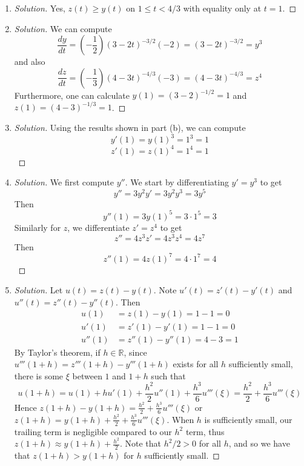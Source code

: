 \documentclass{article}
\newcommand{\R}{{\mathbb R}}
\begin{document}
\begin{enumerate}
	\item \begin{proof}[Solution]\let\qed\relax
		Yes, $z(t) \geq y(t)$ on $1 \leq t < 4/3$ with equality
		only at $t = 1$.
	\end{proof}
	\item \begin{proof}[Solution]\let\qed\relax
		We can compute
		\[
			\frac{dy}{dt} = \left(-\frac{1}{2}\right)(3-2t)^{-3/2}(-2)
			= (3-2t)^{-3/2} = y^3
		\]
		and also
		\[
			\frac{dz}{dt} = \left(-\frac{1}{3}\right)(4-3t)^{-4/3}(-3)
			= (4-3t)^{-4/3} = z^4
		\]
		Furthermore, one can calculate $y(1) = (3-2)^{-1/2} = 1$
		and $z(1) = (4-3)^{-1/3} = 1$.
	\end{proof}
	\item \begin{proof}[Solution]\let\qed\relax
		Using the results shown in part (b), we can compute
		\[
			y'(1) = y(1)^3 = 1^3 = 1
		\]
		\[
			z'(1) = z(1)^4 = 1^4 = 1
		\]
	\end{proof}
	\item \begin{proof}[Solution]\let\qed\relax
		We first compute $y''$. We start by differentiating $y' = y^3$ to get
		\[
			y'' = 3y^2y' = 3y^2y^3 = 3y^5
		\]
		Then
		\[
			y''(1) = 3y(1)^5 = 3\cdot 1^5 = 3
		\]
		Similarly for $z$, we differentiate $z' = z^4$ to get
		\[
			z'' = 4z^3z' = 4z^3z^4 = 4z^7
		\]
		Then
		\[
			z''(1) = 4z(1)^7 = 4\cdot 1^7 = 4
		\]
	\end{proof}
	\item \begin{proof}[Solution]\let\qed\relax
		Let $u(t) = z(t) - y(t)$.
		Note $u'(t) = z'(t) - y'(t)$ and $u''(t) = z''(t) - y''(t)$.
		Then
		\begin{align*}
			u(1) &= z(1) - y(1) = 1-1 = 0\\
			u'(1) &= z'(1) - y'(1) = 1-1 = 0\\
			u''(1) &= z''(1) - y''(1) = 4 - 3 = 1
		\end{align*}
		By Taylor's theorem, if $h \in \R$,
		since $u'''(1+h) = z'''(1+h) - y'''(1+h)$ exists for all
		$h$ sufficiently small,
		there is some $\xi$ between $1$ and $1+h$ such that
		\[
			u(1 + h) = u(1) + hu'(1) + \frac{h^2}{2}u''(1) + \frac{h^3}{6}u'''(\xi)
			= \frac{h^2}{2} + \frac{h^3}{6}u'''(\xi)
		\]
		Hence $z(1+h) - y(1+h) = \frac{h^2}{2}+\frac{h^3}{6}u'''(\xi)$
		or $z(1+h) = y(1+h) + \frac{h^2}{2} + \frac{h^3}{6}u'''(\xi)$.
		When $h$ is sufficiently small, our trailing term is negligible
		compared to our $h^2$ term,
		thus $z(1+h) \approx y(1+h) + \frac{h^2}{2}$.
		Note that $h^2/2 > 0$ for all $h$, and so we have that
		$z(1+h) > y(1+h)$ for $h$ sufficiently small.
	\end{proof}
\end{enumerate}
\end{document}
